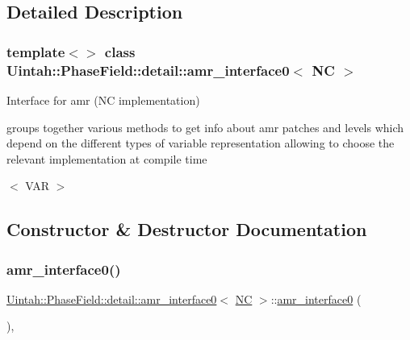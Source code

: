 \subsection{Detailed Description}
\subsubsection*{template$<$$>$\newline
class Uintah\+::\+Phase\+Field\+::detail\+::amr\+\_\+interface0$<$ N\+C $>$}

Interface for amr (NC implementation) 

groups together various methods to get info about amr patches and levels which depend on the different types of variable representation allowing to choose the relevant implementation at compile time

$<$ V\+AR $>$ 

\subsection{Constructor \& Destructor Documentation}
\mbox{\label{classUintah_1_1PhaseField_1_1detail_1_1amr__interface0_3_01NC_01_4_a16d98f7ce2ef79663793cd2235c857bc}} 
\subsubsection{\texorpdfstring{amr\+\_\+interface0()}{amr\_interface0()}\hspace{0.1cm}{\footnotesize\ttfamily [1/2]}}
{\footnotesize\ttfamily \hyperlink{classUintah_1_1PhaseField_1_1detail_1_1amr__interface0}{Uintah\+::\+Phase\+Field\+::detail\+::amr\+\_\+interface0}$<$ \hyperlink{namespaceUintah_1_1PhaseField_a33d355affda78a83f45755ba8388cedda77924170fe82bfd58b74ca3e44139718}{NC} $>$\+::\hyperlink{classUintah_1_1PhaseField_1_1detail_1_1amr__interface0}{amr\+\_\+interface0} (\begin{DoxyParamCaption}{ }\end{DoxyParamCaption})\hspace{0.3cm}{\ttfamily [protected]}, {\ttfamily [delete]}}



